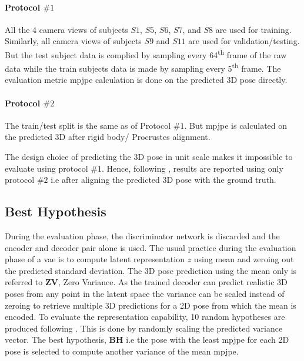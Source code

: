 \paragraph{Protocol $\#1$} All the 4 camera views of subjects $S1$, $S5$, $S6$, $S7$, and $S8$ are used for training. Similarly, all camera views of subjects $S9$ and $S11$ are used for validation/testing. But the test subject data is complied by sampling every 64\textsuperscript{th} frame of the raw data while the train subjects data is made by sampling every 5\textsuperscript{th} frame. 
The evaluation metric \ac{mpjpe} calculation is done on the predicted 3D pose directly.

\paragraph{Protocol $\#2$} The train/test split is the same as of Protocol $\#1$. But \ac{mpjpe} is calculated on the predicted 3D after rigid body/ Procrustes alignment.

The design choice of predicting the 3D pose in unit scale makes it impossible to evaluate using protocol $\#1$. Hence, following \cite{amazon1}, results are reported using only protocol $\#2$ i.e after aligning the predicted 3D pose with the ground truth.

\subsection{Best Hypothesis}
During the evaluation phase, the discriminator network is discarded and the encoder and decoder pair alone is used. The usual practice during the evaluation phase of a \ac{vae} is to compute latent representation $z$ using mean and zeroing out the predicted standard deviation. The 3D pose prediction using the mean only is referred to $\textbf{ZV}$, Zero Variance. As the trained decoder can predict realistic 3D poses from any point in the latent space the variance can be scaled instead of zeroing to retrieve multiple 3D predictions for a 2D pose from which the mean is encoded. To evaluate the representation capability, 10 random hypotheses are produced following \cite{weaklymultiple}. This is done by randomly scaling the predicted variance vector. The best hypothesis, \textbf{BH} i.e the pose with the least \ac{mpjpe} for each 2D pose is selected to compute another variance of the mean \ac{mpjpe}. 
